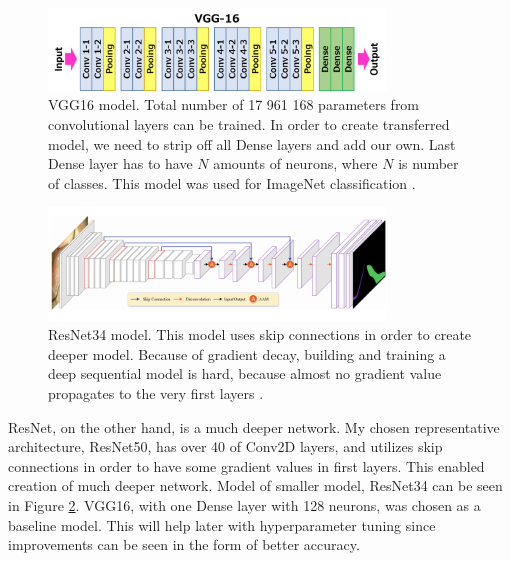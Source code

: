 \documentclass[thesis=B,english]{FITthesis}[2019/12/23]
\begin{document}
\begin{figure}
    \centering
    \includegraphics[width=0.8\textwidth]{vgg16.png}
    \caption[VGG16 model]{VGG16 model. Total number of 17 961 168 parameters from convolutional layers can be trained. In order to create transferred model, we need to strip off all Dense layers and add our own. Last Dense layer has to have $N$ amounts of neurons, where $N$ is number of classes. This model was used for ImageNet classification \cite{hassan_2018}.}
    \label{fig:vgg16}
\end{figure}

\begin{figure}
    \centering
    \includegraphics[width=0.8\textwidth]{resnet.PNG}
    \caption[ResNet34 model]{ResNet34 model. This model uses skip connections in order to create deeper model. Because of gradient decay, building and training a deep sequential model is hard, because almost no gradient value propagates to the very first layers \cite{resnet34_model}.}
    \label{fig:resnet_34}
\end{figure}

ResNet, on the other hand, is a much deeper network. My chosen representative architecture, ResNet50, has over 40 of Conv2D layers, and utilizes skip connections in order to have some gradient values in first layers. This enabled creation of much deeper network. Model of smaller model, ResNet34 can be seen in Figure \ref{fig:resnet_34}. VGG16, with one Dense layer with 128 neurons, was chosen as a baseline model. This will help later with hyperparameter tuning since improvements can be seen in the form of better accuracy. 
\end{document}
